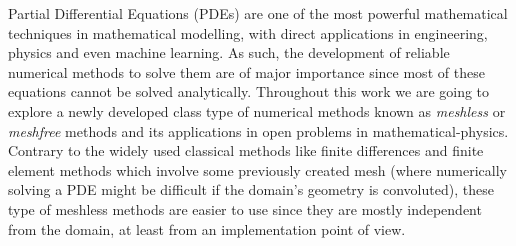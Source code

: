 \label{chap:intro}





Partial Differential Equations (PDEs) are one of the most powerful mathematical techniques in mathematical modelling, with direct applications in engineering, physics and even machine learning. As such, the development of reliable numerical methods to solve them are of major importance since most of these equations cannot be solved analytically. Throughout this work we are going to explore a newly developed class type of numerical methods known as \textit{meshless} or \textit{meshfree} methods and its applications in open problems in mathematical-physics. Contrary to the widely used classical methods like finite differences and finite element methods which involve some previously created mesh (where numerically solving a PDE might be difficult if the domain's geometry is convoluted), these type of meshless methods are easier to use since they are mostly independent from the domain, at least from an implementation point of view.

